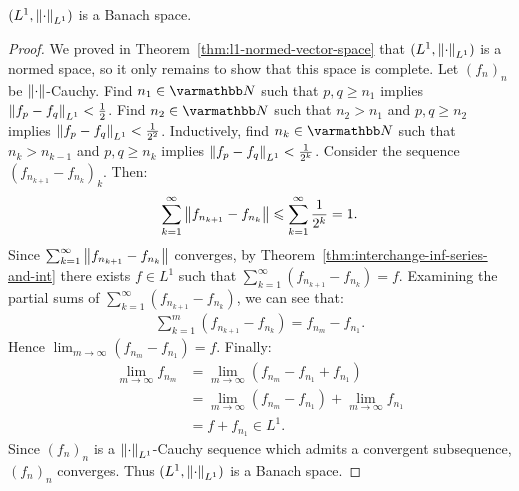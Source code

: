 \begin{theorem}
    $(L^1,\left\lVert \cdot \right\rVert_{L^1})$ is a Banach space.
\end{theorem}
    \begin{proof}
        We proved in Theorem~\ref{thm:l1-normed-vector-space} that $(L^1,\left\lVert \cdot \right\rVert_{L^1})$ is a normed space, so it only remains to show that this space is complete. Let $(f_n)_n$ be $\left\lVert \cdot \right\rVert$-Cauchy. Find $n_1 \in \bfN$ such that $p,q \geq n_1$ implies $\left\lVert f_p - f_q \right\rVert_{L^1} < \frac{1}{2}$. Find $n_2 \in \bfN$ such that $n_2 > n_1$ and $p,q \geq n_2$ implies $\left\lVert f_p - f_q \right\rVert_{L^1} < \frac{1}{2^2}$. Inductively, find $n_k \in \bfN$ such that $n_k > n_{k-1}$ and $p,q \geq n_k$ implies $\left\lVert f_p - f_q \right\rVert_{L^1} < \frac{1}{2^k}$. Consider the sequence $(f_{n_{k+1}}-f_{n_k})_k$. Then:
            \begin{equation*}
            \begin{split}
                \sum_{k = 1}^\infty \left\lVert f_{n_{k+1}} - f_{n_k} \right\rVert \leqslant \sum_{k = 1}^\infty \frac{1}{2^k} = 1.
            \end{split}
            \end{equation*}
        Since $\sum_{k = 1}^\infty \left\lVert f_{n_{k+1}} - f_{n_k} \right\rVert$ converges, by Theorem~\ref{thm:interchange-inf-series-and-int} there exists $f \in L^1$ such that $\sum_{k = 1}^\infty (f_{n_{k+1}} - f_{n_k} ) = f$. Examining the partial sums of $\sum_{k = 1}^\infty (f_{n_{k+1}} - f_{n_k} )$, we can see that:
            \begin{equation*}
            \begin{split}
                \sum_{k = 1}^m (f_{n_{k+1}} - f_{n_k}) = f_{n_m} - f_{n_1}.
            \end{split}
            \end{equation*}
        Hence $\lim_{m \rightarrow \infty} (f_{n_m} - f_{n_1}) = f$. Finally:
            \begin{equation*}
            \begin{split}
                \lim_{m \rightarrow \infty} f_{n_m} 
                & = \lim_{m \rightarrow \infty} (f_{n_m} - f_{n_1} + f_{n_1}) \\
                & = \lim_{m \rightarrow \infty} (f_{n_m} - f_{n_1}) + \lim_{m \rightarrow \infty}f_{n_1} \\
                & = f + f_{n_1} \in L^1.
            \end{split}
            \end{equation*}
        Since $(f_n)_n$ is a $\left\lVert \cdot \right\rVert_{L^1}$-Cauchy sequence which admits a convergent subsequence, $(f_n)_n$ converges. Thus $(L^1, \left\lVert \cdot \right\rVert_{L^1})$ is a Banach space.
    \end{proof}

